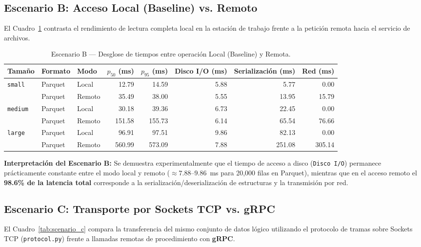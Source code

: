 \documentclass[11pt,a4paper]{article}
\begin{document}
\subsection{Escenario B: Acceso Local (Baseline) vs. Remoto}
El Cuadro~\ref{tab:scenario_b} contrasta el rendimiento de lectura completa local en la estación de trabajo frente a la petición remota hacia el servicio de archivos.

\begin{table}[H]
\centering
\caption{Escenario B — Desglose de tiempos entre operación Local (Baseline) y Remota.}
\label{tab:scenario_b}
\begin{tabular}{lllrrrrr}
\toprule
\textbf{Tamaño} & \textbf{Formato} & \textbf{Modo} & \textbf{$p_{50}$ (ms)} & \textbf{$p_{95}$ (ms)} & \textbf{Disco I/O (ms)} & \textbf{Serialización (ms)} & \textbf{Red (ms)} \\
\midrule
\multirow{2}{*}{\texttt{small}} & Parquet & Local & 12.79 & 14.59 & 5.88 & 5.77 & 0.00 \\
 & Parquet & Remoto & 35.49 & 38.00 & 5.55 & 13.95 & 15.79 \\
\midrule
\multirow{2}{*}{\texttt{medium}} & Parquet & Local & 30.18 & 39.36 & 6.73 & 22.45 & 0.00 \\
 & Parquet & Remoto & 151.58 & 155.73 & 6.14 & 65.54 & 76.66 \\
\midrule
\multirow{2}{*}{\texttt{large}} & Parquet & Local & 96.91 & 97.51 & 9.86 & 82.13 & 0.00 \\
 & Parquet & Remoto & 560.99 & 573.09 & 7.88 & 251.08 & 305.14 \\
\bottomrule
\end{tabular}
\end{table}

\textbf{Interpretación del Escenario B:} Se demuestra experimentalmente que el tiempo de acceso a disco (\texttt{Disco I/O}) permanece prácticamente constante entre el modo local y remoto ($\approx 7.88$--$9.86$~ms para 20,000 filas en Parquet), mientras que en el acceso remoto el \textbf{98.6\% de la latencia total} corresponde a la serialización/deserialización de estructuras y la transmisión por red.

\subsection{Escenario C: Transporte por Sockets TCP vs. gRPC}
El Cuadro~\ref{tab:scenario_c} compara la transferencia del mismo conjunto de datos lógico utilizando el protocolo de tramas sobre Sockets TCP (\texttt{protocol.py}) frente a llamadas remotas de procedimiento con \textbf{gRPC}.
\end{document}
